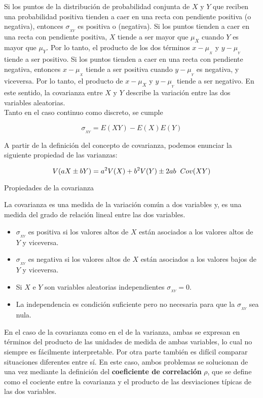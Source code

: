 \documentclass[base=hide,12pt]{elegantbook}
\begin{document}
Si los puntos de la distribución de probabilidad conjunta de $X$ y $Y$ que reciben una probabilidad positiva tienden a caer en una recta con pendiente positiva (o negativa), entonces $\sigma_{_{XY}}$ es positiva o (negativa). Si los puntos tienden a caer en una recta con pendiente positiva, $X$ tiende a ser mayor que $\mu_{X}$ cuando $Y$ es mayor que $\mu_{Y}$. Por lo tanto, el producto de los dos términos $x-\mu_{_{X}}$ y $y-\mu_{_{Y}}$ tiende a ser positivo. Si los puntos tienden a caer en una recta con pendiente negativa, entonces $x-\mu_{_{X}}$ tiende a ser positiva cuando $y-\mu_{_{Y}}$ es negativa, y viceversa. Por lo tanto, el producto de $x-\mu_{X}$ y $y-\mu_{_{Y}}$ tiende a ser negativo. En este sentido, la covarianza entre $X$ y $Y$ describe la variación entre las dos variables aleatorias.\\
%
Tanto en el caso continuo como discreto, se cumple

\[\sigma_{_{XY}}=E\left(XY\right)-E\left(X\right)E\left(Y\right)\]

A partir de la definición del concepto de covarianza, podemos enunciar la siguiente propiedad de las varianzas:

$$V(aX \pm bY)=a^{2}V(X)+b^{2}V(Y) \pm 2ab \hspace{.2cm}Cov(XY)$$

\begin{Box2}{Propiedades de la covarianza}
	
La covarianza es una medida de la variación común a dos variables y, es una medida del grado de relación lineal entre las dos variables.

\begin{itemize}
	\item $\sigma_{_{XY}}$ es positiva si los valores altos de $X$ están asociados a los valores altos de $Y$  y viceversa.	
	\item $\sigma_{_{XY}}$ es negativa si los valores altos de $X$ están asociados a los valores bajos de $Y$ y viceversa.	
	\item Si $X$ e $Y$ son variables aleatorias independientes $\sigma_{_{XY}}=0$.	
	\item La independencia es condición suficiente pero no necesaria para que la $\sigma_{_{XY}}$ sea nula.
\end{itemize}

\end{Box2}
\vspace{.5cm} 

En el caso de la covarianza como en el de la varianza, ambas se expresan en términos del producto de las unidades de medida de ambas variables, lo cual no siempre es fácilmente interpretable. Por otra parte también es difícil comparar situaciones diferentes entre sí. En este caso, ambos problemas se solucionan de una vez mediante la definición del \textbf{coeficiente de correlación} $\rho$, que se define como el cociente entre la covarianza y el producto de las desviaciones típicas de las dos variables.
\end{document}
